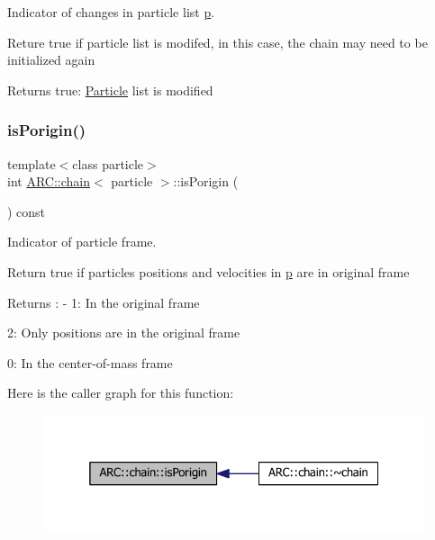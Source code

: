 Indicator of changes in particle list \hyperlink{classARC_1_1chain_af1793b656e139e1f87c2e0a55f87514b}{p}. 

Reture true if particle list is modifed, in this case, the chain may need to be initialized again \begin{DoxyReturn}{Returns}
true\+: \hyperlink{classParticle}{Particle} list is modified 
\end{DoxyReturn}
\hypertarget{classARC_1_1chain_afd0342ec9b20a318d811f3ec0f6c9950}{}\label{classARC_1_1chain_afd0342ec9b20a318d811f3ec0f6c9950} 
\subsubsection{\texorpdfstring{is\+Porigin()}{isPorigin()}}
{\footnotesize\ttfamily template$<$class particle$>$ \\
int \hyperlink{classARC_1_1chain}{A\+R\+C\+::chain}$<$ particle $>$\+::is\+Porigin (\begin{DoxyParamCaption}{ }\end{DoxyParamCaption}) const\hspace{0.3cm}{\ttfamily [inline]}}



Indicator of particle frame. 

Return true if particles positions and velocities in \hyperlink{classARC_1_1chain_af1793b656e139e1f87c2e0a55f87514b}{p} are in original frame \begin{DoxyReturn}{Returns}
\+: -\/ 1\+: In the original frame
\begin{DoxyItemize}
\item 2\+: Only positions are in the original frame
\item 0\+: In the center-\/of-\/mass frame 
\end{DoxyItemize}
\end{DoxyReturn}
Here is the caller graph for this function\+:
\nopagebreak
\begin{figure}[H]
\begin{center}
\leavevmode
\includegraphics[width=325pt]{classARC_1_1chain_afd0342ec9b20a318d811f3ec0f6c9950_icgraph}
\end{center}
\end{figure}
\hypertarget{classARC_1_1chain_a82b26731761231d86fd2e0b4529df6fa}{}\label{classARC_1_1chain_a82b26731761231d86fd2e0b4529df6fa} 
